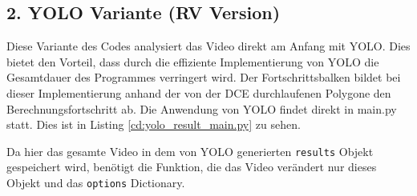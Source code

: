 \subsection{2. YOLO Variante (RV Version)}{
	\label{py:YOLO_res_vers}
	Diese Variante des Codes analysiert das Video direkt am Anfang mit YOLO. Dies bietet den Vorteil, dass durch die effiziente Implementierung von YOLO die Gesamtdauer des Programmes verringert wird. Der Fortschrittsbalken bildet bei dieser Implementierung anhand der von der DCE durchlaufenen Polygone den Berechnungsfortschritt ab.  Die Anwendung von YOLO findet direkt in main.py statt. \ifimportant Dies ist in Listing \ref{cd:yolo_result_main.py} zu sehen. \fi
    \ifimportant
	
	\fi	Da hier das gesamte Video in dem von YOLO generierten \lstinline|results| Objekt gespeichert wird, benötigt die Funktion, die das Video verändert nur dieses Objekt und das \lstinline|options| Dictionary. \\
	
}
